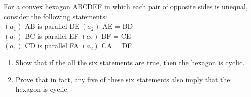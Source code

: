 \item For a convex hexagon ABCDEF in which each pair of opposite sides is unequal, consider the following statements:
\\$(a_1)$ AB is parallel DE    $(a_2)$ AE = BD\\
$(a_1)$ BC is parallel EF      $(a_2)$ BF = CE\\
$(a_1)$ CD is parallel FA      $(a_2)$ CA = DF
\begin{enumerate}
\item Show that if the all the six statements are true, then the hexagon is cyclic.
\item Prove that in fact, any five of these six statements also imply that the hexagon is cyclic. 
\end{enumerate}

























